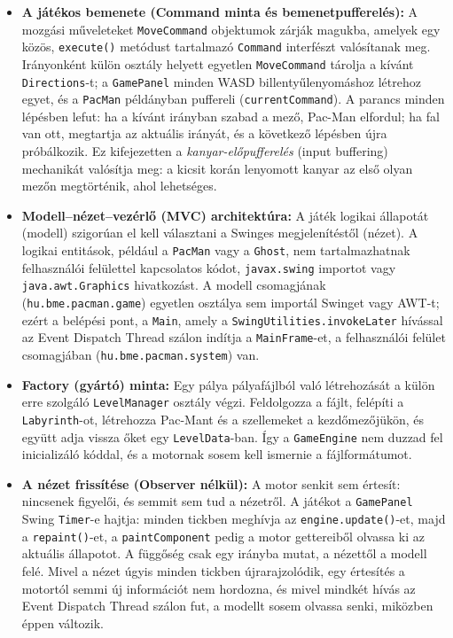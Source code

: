 \documentclass[11pt, a4paper]{article}
\begin{document}
\begin{itemize}
    \item \textbf{A játékos bemenete (Command minta és bemenetpufferelés):} A mozgási műveleteket \texttt{MoveCommand} objektumok zárják magukba, amelyek egy közös, \texttt{execute()} metódust tartalmazó \texttt{Command} interfészt valósítanak meg. Irányonként külön osztály helyett egyetlen \texttt{MoveCommand} tárolja a kívánt \texttt{Directions}-t; a \texttt{GamePanel} minden WASD billentyűlenyomáshoz létrehoz egyet, és a \texttt{PacMan} példányban puffereli (\texttt{currentCommand}). A parancs minden lépésben lefut: ha a kívánt irányban szabad a mező, Pac-Man elfordul; ha fal van ott, megtartja az aktuális irányát, és a következő lépésben újra próbálkozik. Ez kifejezetten a \textit{kanyar-előpufferelés} (input buffering) mechanikát valósítja meg: a kicsit korán lenyomott kanyar az első olyan mezőn megtörténik, ahol lehetséges.
    \item \textbf{Modell–nézet–vezérlő (MVC) architektúra:} A játék logikai állapotát (modell) szigorúan el kell választani a Swinges megjelenítéstől (nézet). A logikai entitások, például a \texttt{PacMan} vagy a \texttt{Ghost}, nem tartalmazhatnak felhasználói felülettel kapcsolatos kódot, \texttt{javax.swing} importot vagy \texttt{java.awt.Graphics} hivatkozást. A modell csomagjának (\texttt{hu.bme.pacman.game}) egyetlen osztálya sem importál Swinget vagy AWT-t; ezért a belépési pont, a \texttt{Main}, amely a \texttt{SwingUtilities.invokeLater} hívással az Event Dispatch Thread szálon indítja a \texttt{MainFrame}-et, a felhasználói felület csomagjában (\texttt{hu.bme.pacman.system}) van.
    \item \textbf{Factory (gyártó) minta:} Egy pálya pályafájlból való létrehozását a külön erre szolgáló \texttt{LevelManager} osztály végzi. Feldolgozza a fájlt, felépíti a \texttt{Labyrinth}-ot, létrehozza Pac-Mant és a szellemeket a kezdőmezőjükön, és együtt adja vissza őket egy \texttt{LevelData}-ban. Így a \texttt{GameEngine} nem duzzad fel inicializáló kóddal, és a motornak sosem kell ismernie a fájlformátumot.
    \item \textbf{A nézet frissítése (Observer nélkül):} A motor senkit sem értesít: nincsenek figyelői, és semmit sem tud a nézetről. A játékot a \texttt{GamePanel} Swing \texttt{Timer}-e hajtja: minden tickben meghívja az \texttt{engine.update()}-et, majd a \texttt{repaint()}-et, a \texttt{paintComponent} pedig a motor gettereiből olvassa ki az aktuális állapotot. A függőség csak egy irányba mutat, a nézettől a modell felé. Mivel a nézet úgyis minden tickben újrarajzolódik, egy értesítés a motortól semmi új információt nem hordozna, és mivel mindkét hívás az Event Dispatch Thread szálon fut, a modellt sosem olvassa senki, miközben éppen változik.
\end{itemize}
\end{document}
